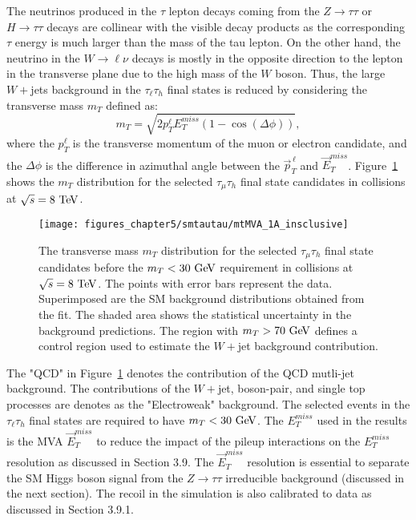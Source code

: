 The neutrinos produced in the $\tau$ lepton decays coming from the $Z\rightarrow\tau\tau$ or $H\rightarrow\tau\tau$ decays are collinear with the visible decay products as the corresponding $\tau$ energy is much larger than the mass of the tau lepton. On the other hand, the neutrino in the $W\rightarrow\ell\nu$ decays is mostly in the opposite direction to the lepton in the transverse plane due to the high mass of the $W$ boson. Thus, the large $W+$jets background in the $\tau_{\ell}\tau_{h}$ final states is reduced by considering the transverse mass $m_{T}$ defined as:
 \begin{equation} \label{eq:mt}
m_{T} = \sqrt{2p_{T}^{\ell}E_{T}^{miss}(1-\cos(\Delta \phi))},
\end{equation}
where the $p_{T}^{\ell}$ is the transverse momentum of the muon or electron candidate, and the $\Delta \phi$ is the difference in azimuthal angle between the $\vec{p}_{T}^{\,\ell}$ and $\vec{E}_{T}^{miss}$. Figure~\ref{fig:mt} shows the $m_{T}$ distribution for the selected  $\tau_{\mu}\tau_{h}$ final state candidates in collisions at $\sqrt{s}=8~\mathrm{Te\kern -0.1em V}$.
\begin{figure}[htbp]
\centering
\texttt{[image: figures\_chapter5/smtautau/mtMVA\_1A\_insclusive]}
\caption{The transverse mass $m_T$ distribution  for the selected $\tau_{\mu}\tau_{h}$ final state candidates before the $m_{T}<30~\mathrm{Ge\kern -0.1em V}$ requirement in collisions at $\sqrt{s}=8~\mathrm{Te\kern -0.1em V}$. The points with error bars represent the data. Superimposed are the SM background distributions obtained from the fit. The shaded area shows the statistical uncertainty in the background predictions. The region with $m_{T}>70~\mathrm{Ge\kern -0.1em V}$ defines a control region used to estimate the $W+$jet background contribution.}
\label{fig:mt}
\end{figure}
The "QCD" in Figure~\ref{fig:mt} denotes the contribution of the QCD mutli-jet background. The contributions of the $W+$jet, boson-pair, and single top processes are denotes as the "Electroweak" background. The selected events in the $\tau_{\ell}\tau_{h}$ final states are required to have $m_{T}<30~\mathrm{Ge\kern -0.1em V}$.  The $E_{T}^{miss}$ used in the results is the MVA  $\vec{E}_{T}^{miss}$ to reduce the impact of the pileup interactions on the $E_{T}^{miss}$ resolution as discussed in Section 3.9. The $\vec{E}_{T}^{miss}$ resolution is essential to separate the SM Higgs boson signal from the $Z\rightarrow\tau\tau$ irreducible background (discussed in the next section). The recoil in the simulation is also calibrated to data as discussed in Section 3.9.1.

